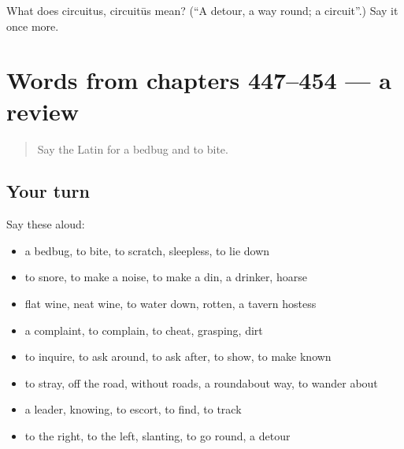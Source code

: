 \begin{tcolorbox}[breakable,colback=teal!4,colframe=teal!35!black,title={Before you move on}]
What does circuitus, circuitūs mean? (\textquotedblleft{}A detour, a way round; a circuit\textquotedblright{}.) Say it once more.
\end{tcolorbox}
\section[(dialogue)]{Words from chapters 447–454 — a review}

\label{lesson:LA-R454-review-447-454}



\begin{quote}
Say the Latin for a bedbug and to bite.
\end{quote}

\subsection*{Your turn}
Say these aloud:

\begin{itemize}
\raggedright
  \item a bedbug, to bite, to scratch, sleepless, to lie down
  \item to snore, to make a noise, to make a din, a drinker, hoarse
  \item flat wine, neat wine, to water down, rotten, a tavern hostess
  \item a complaint, to complain, to cheat, grasping, dirt
  \item to inquire, to ask around, to ask after, to show, to make known
  \item to stray, off the road, without roads, a roundabout way, to wander about
  \item a leader, knowing, to escort, to find, to track
  \item to the right, to the left, slanting, to go round, a detour
\end{itemize}

